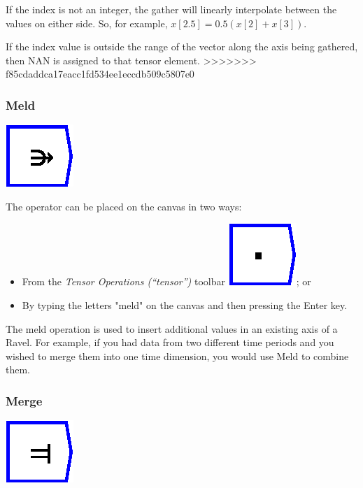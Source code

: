 If the index is not an integer, the gather will linearly interpolate
between the values on either side. So, for example, $x[2.5]=0.5(x[2]+x[3])$.

If the index value is outside the range of the vector along the axis
being gathered, then NAN is assigned to that tensor element.
>>>>>>> f85cdaddca17eacc1fd534ee1eccdb509c5807e0

\subsubsection{Meld}

\label{Operation:meld}

\includegraphics{images/meld}

The operator can be placed on the canvas in two ways:
\begin{itemize}
\item From the \emph{Tensor Operations (``tensor'')} toolbar \includegraphics{images/innerProduct};
or 
\item By typing the letters "meld" on the canvas and then pressing the
Enter key.
\end{itemize}
The meld operation is used to insert additional values in an existing
axis of a Ravel. For example, if you had data from two different time
periods and you wished to merge them into one time dimension, you
would use Meld to combine them.

\subsubsection{Merge}

\label{Operation:merge}

\includegraphics{images/merge}

